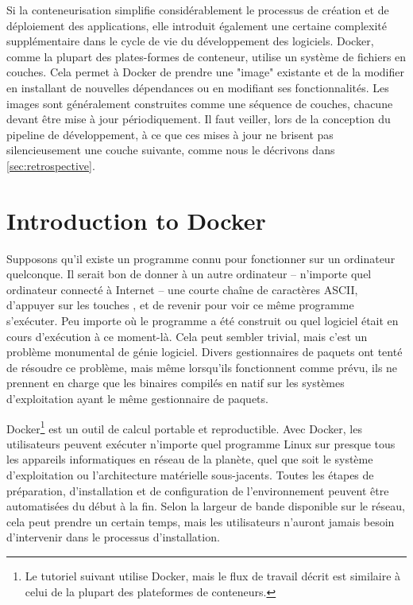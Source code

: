 Si la conteneurisation simplifie considérablement le processus de création et de déploiement des applications, elle introduit également une certaine complexité supplémentaire dans le cycle de vie du développement des logiciels. Docker, comme la plupart des plates-formes de conteneur, utilise un système de fichiers en couches. Cela permet à Docker de prendre une "image" existante et de la modifier en installant de nouvelles dépendances ou en modifiant ses fonctionnalités. Les images sont généralement construites comme une séquence de couches, chacune devant être mise à jour périodiquement. Il faut veiller, lors de la conception du pipeline de développement, à ce que ces mises à jour ne brisent pas silencieusement une couche suivante, comme nous le décrivons dans \autoref{sec:retrospective}.

\section{Introduction to Docker}\label{sec:docker-intro}

Supposons qu'il existe un programme connu pour fonctionner sur un ordinateur quelconque. Il serait bon de donner à un autre ordinateur -- n'importe quel ordinateur connecté à Internet -- une courte chaîne de caractères ASCII, d'appuyer sur les touches \keys{\return}, et de revenir pour voir ce même programme s'exécuter. Peu importe où le programme a été construit ou quel logiciel était en cours d'exécution à ce moment-là. Cela peut sembler trivial, mais c'est un problème monumental de génie logiciel. Divers gestionnaires de paquets ont tenté de résoudre ce problème, mais même lorsqu'ils fonctionnent comme prévu, ils ne prennent en charge que les binaires compilés en natif sur les systèmes d'exploitation ayant le même gestionnaire de paquets.

Docker\footnote{Le tutoriel suivant utilise Docker, mais le flux de travail décrit est similaire à celui de la plupart des plateformes de conteneurs.} est un outil de calcul portable et reproductible. Avec Docker, les utilisateurs peuvent exécuter n'importe quel programme Linux sur presque tous les appareils informatiques en réseau de la planète, quel que soit le système d'exploitation ou l'architecture matérielle sous-jacents. Toutes les étapes de préparation, d'installation et de configuration de l'environnement peuvent être automatisées du début à la fin. Selon la largeur de bande disponible sur le réseau, cela peut prendre un certain temps, mais les utilisateurs n'auront jamais besoin d'intervenir dans le processus d'installation.

